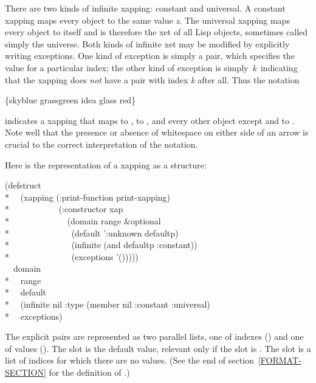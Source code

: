 \begin{defun}[Function]
\begin{new}
There are two kinds of infinite xapping: constant and universal.
A constant xapping  maps every object to the same value \emph{z}.
The universal xapping \cd{\{\Xarrowright\}} maps every object to itself and is therefore the xet
of all Lisp objects, sometimes called simply the universe.
Both kinds of infinite xet may be modified by explicitly writing exceptions.
One kind of exception is simply a pair, which specifies the value for a particular index;
the other kind of exception is simply \,\emph{k}\Xarrowright\, indicating that the xapping does
\emph{not} have a pair with index \emph{k} after all.  Thus the notation
\begin{lisp}
\{sky\Xarrowright blue grass\Xarrowright green idea\Xarrowright{} glass\Xarrowright{} \Xarrowright red\}
\end{lisp}
indicates a xapping that maps  to ,  to ,
and every other object except  and  to .
Note well that the presence or absence of whitespace on either side
of an arrow is crucial to the correct interpretation
of the notation.

Here is the representation of a xapping as a structure:
\begin{lisp}
(defstruct \\*
~~(xapping (:print-function print-xapping) \\*
~~~~~~~~~~~(:constructor xap \\*
~~~~~~~~~~~~~(domain range \&optional \\*
~~~~~~~~~~~~~~(default ':unknown defaultp) \\*
~~~~~~~~~~~~~~(infinite (and defaultp :constant)) \\*
~~~~~~~~~~~~~~(exceptions '())))) \\
~~domain \\*
~~range \\*
~~default \\*
~~(infinite nil :type (member nil :constant :universal) \\*
~~exceptions)
\end{lisp}
The explicit pairs are represented as two parallel lists, one of indexes ()
and one of values ().  The  slot is the default value, relevant
only if the  slot is .
The  slot is a list of indices for which there are no values.
(See the end of section~\ref{FORMAT-SECTION} for the definition of .)


\end{new}
\end{defun}
